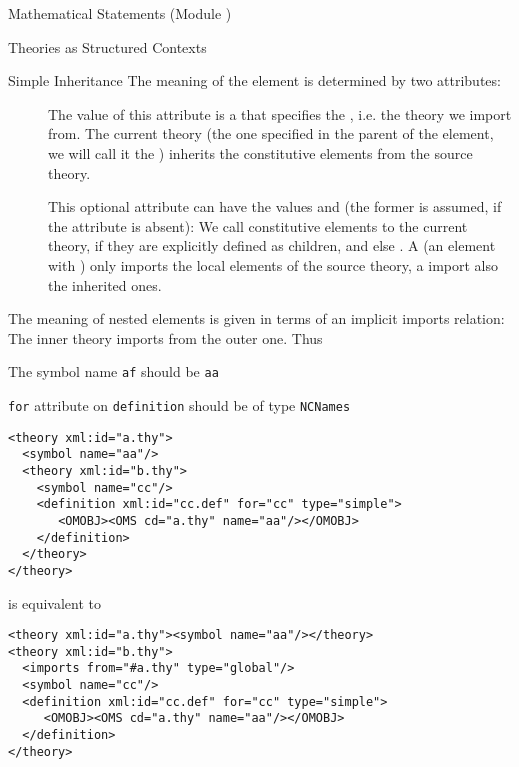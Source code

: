 \begin{tchapter}[id=statements,short=Mathematical Statements]{Mathematical Statements (Module {})}
\begin{tsection}[id=theories]{Theories as Structured Contexts}
\begin{tsubsection}[id=inheritance]{Simple Inheritance}
The meaning of the {} element is determined by two attributes:
\begin{description}
\item[{}] The value of this attribute is a
  {} that specifies the {}, i.e. the
  theory we import from.  The current theory (the one specified in the parent of the
  {} element, we will call it the {}) inherits
  the constitutive elements from the source theory.
\item[{}] This optional attribute can have the values
  {} and {} (the former is
  assumed, if the attribute is absent): We call constitutive elements {} to
  the current theory, if they are explicitly defined as children, and else
  {}. A {} (an {} element with
  {}) only imports the local elements of the source theory, a
  {} import also the inherited ones.
\end{description}
  The meaning of nested {} elements is given in terms of an
  implicit imports relation: The inner theory imports from the outer one. Thus
\begin{erratum}[reported-by=Alberto Gonzales Palomo,date=2006-10-06]{The symbol name {\texttt{af}}
  should be {\texttt{aa}}}
\begin{erratum}[reported-by=Michael Kohlhase,date=2009-08-11]{{\texttt{for}} attribute on
    {\texttt{definition}} should be of type {\texttt{NCNames}}}
\begin{lstlisting}[label=lst:nested-thy,index={theory}]
<theory xml:id="a.thy">
  <symbol name="aa"/>
  <theory xml:id="b.thy">
    <symbol name="cc"/>
    <definition xml:id="cc.def" for="cc" type="simple">
       <OMOBJ><OMS cd="a.thy" name="aa"/></OMOBJ>
    </definition>
  </theory>
</theory>
\end{lstlisting}
is equivalent to 
\begin{lstlisting}[label=lst:nested-thy-equiv,index={theory}]
<theory xml:id="a.thy"><symbol name="aa"/></theory>
<theory xml:id="b.thy">
  <imports from="#a.thy" type="global"/>
  <symbol name="cc"/>
  <definition xml:id="cc.def" for="cc" type="simple">
     <OMOBJ><OMS cd="a.thy" name="aa"/></OMOBJ>
  </definition>
</theory>
\end{lstlisting}
\end{erratum}

\end{erratum}
\end{tsubsection}
\end{tsection}
\end{tchapter}
